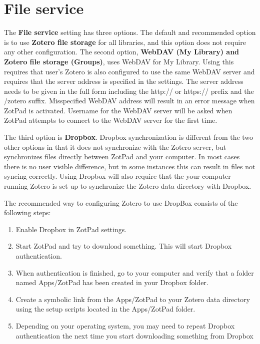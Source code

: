 \documentclass[oneside, openany, 12pt]{tufte-book}
\newcommand{\ipadfootnote}[1]{}
\newcommand{\ipadfootnote}[1]{\footnote{#1}}
\begin{document}
\section{File service}

The \textbf{File service} setting has three options. The default and recommended option is to use \textbf{Zotero file storage} for all libraries, and this option does not require any other configuration. The second option, \textbf{WebDAV (My Library) and Zotero file storage (Groups)}, uses WebDAV for My Library. Using this requires that user's Zotero is also configured to use the same WebDAV server and requires that the server address is specified in the settings. The server address needs to be given in the full form including the http:// or https:// prefix and the /zotero suffix. Misspecified WebDAV address will result in an error message when ZotPad is activated. Username for the WebDAV server will be asked when ZotPad attempts to connect to the WebDAV server for the first time.

The third option is \textbf{Dropbox}. Dropbox synchronization is different from the two other options in that it does not synchronize with the Zotero server, but synchronizes files directly between ZotPad and your computer. In most cases there is no user visible difference, but in some instances this can result in files not syncing correctly\ipadfootnote{For example, if a you edit a file on your computer, but do not sync Zotero, ZotPad does not know that a new version of a file would be available in Dropbox because Zotero server is not aware of this change.}. Using Dropbox will also require that the your computer running Zotero is set up to synchronize the Zotero data directory with Dropbox.

The recommended way to configuring Zotero to use DropBox consists of the following steps:

\begin{enumerate}
\item Enable Dropbox in ZotPad settings.
\item Start ZotPad and try to download something. This will start Dropbox authentication.
\item When authentication is finished, go to your computer and verify that a folder named Apps/ZotPad has been created in your Dropbox folder.
\item Create a symbolic link from the Apps/ZotPad to your Zotero data directory using the setup scripts located in the Apps/ZotPad folder.
\item Depending on your operating system, you may need to repeat Dropbox authentication the next time you start downloading something from Dropbox
\end{enumerate}
\end{document}
